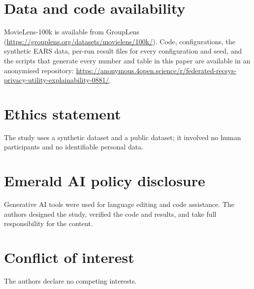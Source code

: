 \documentclass[11pt,a4paper]{article}
\begin{document}
\section*{Data and code availability}
MovieLens-100k is available from GroupLens (\url{https://grouplens.org/datasets/movielens/100k/}). Code, configurations, the synthetic EARS data, per-run result files for every configuration and seed, and the scripts that generate every number and table in this paper are available in an anonymised repository: \url{https://anonymous.4open.science/r/federated-recsys-privacy-utility-explainability-0881/}.

\section*{Ethics statement}
The study uses a synthetic dataset and a public dataset; it involved no human participants and no identifiable personal data.

\section*{Emerald AI policy disclosure}
Generative AI tools were used for language editing and code assistance. The authors designed the study, verified the code and results, and take full responsibility for the content.

\section*{Conflict of interest}
The authors declare no competing interests.



\end{document}
